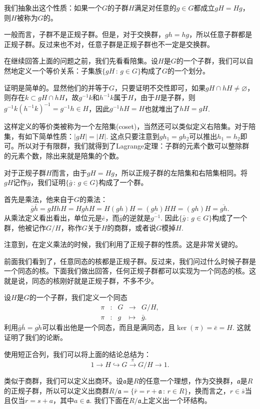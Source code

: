 我们抽象出这个性质：如果一个$G$的子群$H$满足对任意的$g\in G$都成立$gH=Hg$，则$H$被称为$G$的。

一般而言，子群不是正规子群。但是，对于交换群，$gh=hg$，所以任意子群都是正规子群。反过来也不对，任意子群是正规子群也不一定是交换群。

\para 在继续回答上面的问题之前，我们先看看陪集。设$H$是$G$的一个子群，我们可以自然地定义一个等价关系：子集族$\{gH\,:\, g\in G\}$构成了$G$的一个划分。

证明是简单的。显然他们的并等于$G$，只要证明不交性即可，如果$gH\cap hH\neq \varnothing$，则存在$k\subset gH\cap hH$，故$g^{-1}k$和$h^{-1}k$属于$H$，由于$H$是子群，则$g^{-1}k\left(h^{-1}k\right)^{-1}=g^{-1}h\in H$，因此$g^{-1}hH=H$也就堆出了$hH=gH$.

这样定义的等价类被称为一个左陪集(coset)，当然还可以类似定义右陪集。对于陪集，有如下简单性质：$|gH|=|H|$. 这点只要注意到$gh_1=gh_2$可以推出$h_1=h_2$即可。所以对于有限群，我们就得到了Lagrange定理：子群的元素个数可以整除群的元素个数，除出来就是陪集的个数。

\para 对于正规子群$H$而言，由于$gH=Hg$，所以正规子群的左陪集和右陪集相同。将$gH$记作$\bar{g}$，我们证明$\{\bar{g}\,:\, g\in G\}$构成了一个群。

首先是乘法，他来自于$G$的乘法：
\[
	\bar{g}\bar{h}=gHhH=HghH=H(gh)H=(gh)HH=(gh)H=\overline{gh}.
\]
从乘法定义看出看出，单位元是$\bar{e}$，而$\bar{g}$的逆就是$\overline{g^{-1}}$. 因此$\{\bar{g}\,:\, g\in G\}$构成了一个群，他被记作$G/H$，称作$G$关于$H$的商群，或者说$G$模掉$H$.

注意到，在定义乘法的时候，我们利用了正规子群的性质。这是非常关键的。

\para 前面我们看到了，任意同态的核都是正规子群。反过来，我们问过什么时候子群是一个同态的核。下面我们做出回答，任何正规子群都可以实现为一个同态的核。这就是说，同态的核刚好就是正规子群，不多不少。

设$H$是$G$的一个子群，我们定义一个同态
\[
	\begin{array}{ccccc}
		\pi &:&G &\to& G/H,\\
		\pi &:&g &\mapsto& \bar{g}.
	\end{array}
\]
利用$\bar{g}\bar{h}=\overline{gh}$可以看出他是一个同态，而且是满同态，且$\ker(\pi)=\bar{e}=H$. 这就证明了我们的论断。

使用短正合列，我们可以将上面的结论总结为：
\[
	1\to H \hookrightarrow G \xrightarrow{\pi} G/H\to 1.
\]

\para 类似于商群，我们可以定义出商环。设$\mathfrak{a}$是$R$的任意一个理想，作为交换群，$\mathfrak{a}$是$R$的正规子群，所以可以定义出商群$R/\mathfrak{a}=\{\bar{r}=r+\mathfrak{a}\,:\, r\in R\}$，换而言之，$r\in \bar{s}$当且仅当$r=s+a$，其中$a\in \mathfrak{a}$. 我们下面在$R/\mathfrak{a}$上定义出一个环结构。


